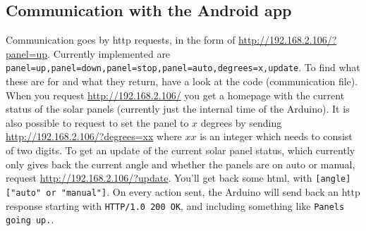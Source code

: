 		\subsection{Communication with the Android app} \label{subsec:arduinotoandroid}
			Communication goes by http requests, in the form of \url{http://192.168.2.106/?panel=up}.
			Currently implemented are \verb|panel=up,panel=down,panel=stop,panel=auto,degrees=x,update|.
			To find what these are for and what they return, have a look at the code (communication file).
			When you request \url{http://192.168.2.106/} you get a homepage with the current status of the solar panels (currently just the internal time of the Arduino).
			It is also possible to request to set the panel to $x$ degrees by sending \url{http://192.168.2.106/?degrees=xx} where $xx$ is an integer which needs to consist of two digits.
			To get an update of the current solar panel status, which currently only gives back the current angle and whether the panels are on auto or manual, request \url{http://192.168.2.106/?update}.
			You'll get back some html, with \verb|[angle] ["auto" or "manual"]|.
			On every action sent, the Arduino will send back an http response starting with \verb|HTTP/1.0 200 OK|, and including something like \verb|Panels going up.|.
